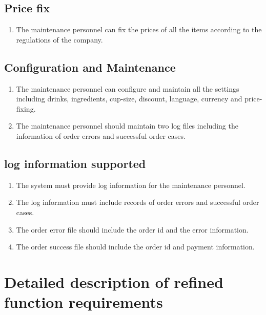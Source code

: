 \documentclass[a4paper]{report}
\begin{document}
\subsection{Price fix}
\begin{enumerate}
\item The maintenance personnel can fix the prices of all the items according to the regulations of the company.
\end{enumerate}

\subsection{Configuration and Maintenance}
\begin{enumerate}
\item The maintenance personnel can configure and maintain all the settings including drinks, ingredients, cup-size, discount, language, currency and price-fixing.
\item The maintenance personnel should maintain two log files including the information of order errors and successful order cases.
\end{enumerate}

\subsection{log information supported}
\begin{enumerate}
\item The system must provide log information for the maintenance personnel.
\item The log information must include records of order errors and successful order cases.
\item The order error file should include the order id and the error information.
\item The order success file should include the order id and payment information.
\end{enumerate}

\section{Detailed description of refined function requirements}
\end{document}
